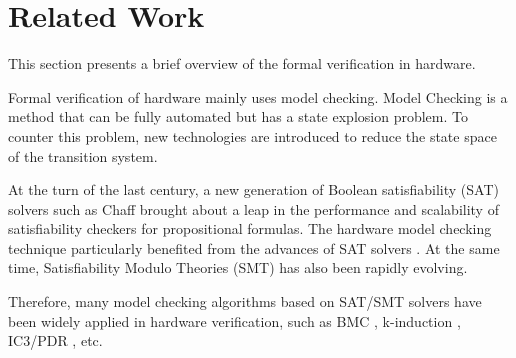 \documentclass[conference]{IEEEtran}
\theoremstyle{definition}
\begin{document}


\section{Related Work}
This section presents a brief overview of the formal verification in hardware.

Formal verification of hardware mainly uses model checking.
Model Checking is a method that can be fully automated but has a state explosion problem. To counter this problem, new technologies are introduced to reduce the state space of the transition system.

At the turn of the last century, a new generation of Boolean satisfiability (SAT) solvers such as Chaff \cite{MoskewiczMZZM01} brought about a leap in the performance and scalability of satisfiability checkers for propositional formulas. The hardware model checking technique particularly benefited from the advances of SAT solvers \cite{vizel2015boolean}. At the same time, Satisfiability Modulo Theories (SMT) \cite{barrett2018satisfiability} has also been rapidly evolving. 

Therefore, many model checking algorithms based on SAT/SMT solvers have been widely applied in hardware verification, such as BMC \cite{BiereCCZ99}, k-induction \cite{tinelli2012smt}, IC3/PDR \cite{Bradley11}, etc.
\end{document}
